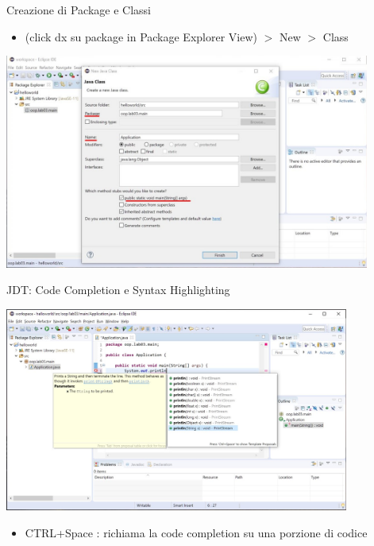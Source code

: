\documentclass[presentation]{beamer}
\begin{document}
\begin{frame}{Creazione di Package e Classi}
\begin{itemize}
\item (click dx su package in Package Explorer View) $>$ New $>$ Class
\end{itemize}
\begin{center}
\includegraphics[width=0.9\textwidth]{img/eclipse-screenshots/eclipse-ide-02d.jpg}
\end{center}
\end{frame}

\begin{frame}{JDT: Code Completion e Syntax Highlighting}
\begin{center}
\includegraphics[width=0.85\textwidth]{img/eclipse-screenshots/eclipse-ide-03.jpg}
\end{center}
\begin{itemize}
\item CTRL+Space : richiama la code completion su una porzione di codice
\end{itemize}
\end{frame}
\end{document}
